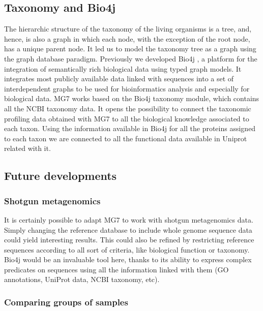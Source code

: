 \documentclass[fleqn,10pt,lineno]{wlpeerj}
\begin{document}
\subsection{Taxonomy and Bio4j}\label{taxonomy-and-bio4j}

The hierarchic structure of the taxonomy of the living organisms is a
tree, and, hence, is also a graph in which each node, with the exception
of the root node, has a unique parent node. It led us to model the
taxonomy tree as a graph using the graph database paradigm. Previously
we developed Bio4j \citep{pareja2015bio4j}, a platform for the
integration of semantically rich biological data using typed graph
models. It integrates most publicly available data linked with sequences
into a set of interdependent graphs to be used for bioinformatics
analysis and especially for biological data. MG7 works based on the
Bio4j taxonomy module, which contains all the NCBI taxonomy data. It
opens the possibility to connect the taxonomic profiling data obtained
with MG7 to all the biological knowledge associated to each taxon. Using
the information available in Bio4j for all the proteins assigned to each
taxon we are connected to all the functional data available in Uniprot
related with it.

\subsection{Future developments}\label{future-developments}

\subsubsection{Shotgun metagenomics}\label{shotgun-metagenomics}

It is certainly possible to adapt MG7 to work with shotgun metagenomics
data. Simply changing the reference database to include whole genome
sequence data could yield interesting results. This could also be
refined by restricting reference sequences according to all sort of
criteria, like biological function or taxonomy. Bio4j would be an
invaluable tool here, thanks to its ability to express complex
predicates on sequences using all the information linked with them (GO
annotations, UniProt data, NCBI taxonomy, etc).

\subsubsection{Comparing groups of
samples}\label{comparing-groups-of-samples}
\end{document}
